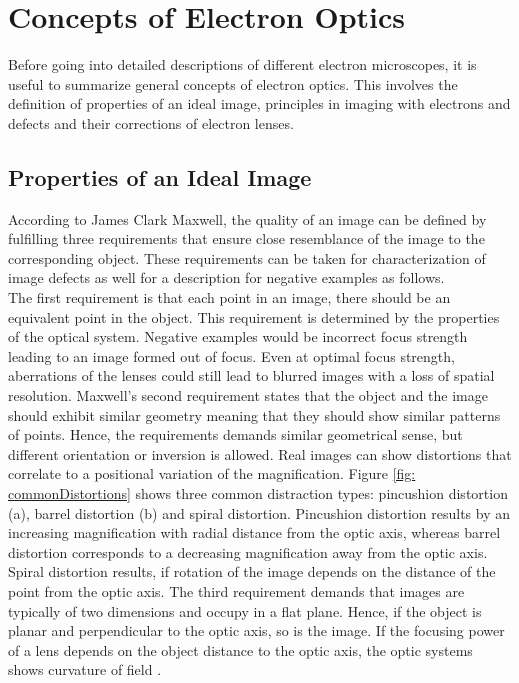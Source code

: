 \section{Concepts of Electron Optics}
\label{sec: electron_optics}

Before going into detailed descriptions of different electron microscopes, it is useful to summarize general concepts of electron optics. This involves the definition of properties of an ideal image, principles in imaging with electrons and defects and their corrections of electron lenses.

\subsection{Properties of an Ideal Image}

According to James Clark Maxwell, the quality of an image can be defined by fulfilling three requirements that ensure close resemblance of the image to the corresponding object. These requirements can be taken for characterization of image defects as well for a description for negative examples as follows.\\

The first requirement is that each point in an image, there should be an equivalent point in the object. This requirement is determined by the properties of the optical system. Negative examples would be incorrect focus strength leading to an image formed out of focus. Even at optimal focus strength, aberrations of the lenses could still lead to blurred images with a loss of spatial resolution. Maxwell's second requirement states that the object and the image should exhibit similar geometry meaning that they should show similar patterns of points. Hence, the requirements demands similar geometrical sense, but different orientation or inversion is allowed. Real images can show distortions that correlate to a positional variation of the magnification. Figure \ref{fig: commonDistortions} shows three common distraction types: pincushion distortion (a), barrel distortion (b) and spiral distortion. Pincushion distortion results by an increasing magnification with radial distance from the optic axis, whereas barrel distortion corresponds to a decreasing magnification away from the optic axis. Spiral distortion results, if rotation of the image depends on the distance of the point from the optic axis. The third requirement demands that images are typically of two dimensions and occupy in a flat plane. Hence, if the object is planar and perpendicular to the optic axis, so is the image. If the focusing power of a lens depends on the object distance to the optic axis, the optic systems shows curvature of field \cite[p.27 f.]{EGERTON_2016}. 

